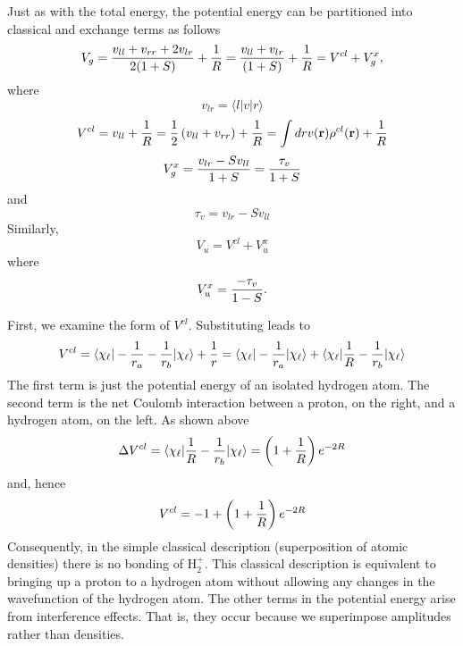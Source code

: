 Just as with the total energy, the potential energy can be partitioned 
into classical and exchange terms as follows
\begin{equation}
V_g = {v_{ll} + v_{rr} + 2v_{lr} \over 2(1+S)} + {1 \over R} = 
{v_{ll} + v_{lr} \over (1+S)} + {1 \over R} = V^{cl} + V^x_g ,
\end{equation}
where
\begin{equation}
v_{lr} = \langle l \vert v \vert r \rangle 
\end{equation}
\begin{equation}
V^{cl} = v_{ll} + {1 \over R} = {1 \over 2} \left( v_{ll} + v_{rr} 
\right) + {1 \over R} = \int d r v ( {\bf r} ) \rho^{cl} ( {\bf 
r} ) + {1 \over R}
\end{equation}
\begin{equation}
V^x_g = {v_{lr} - Sv_{ll} \over 1+S} = {\tau_v \over 1+S}
\end{equation}
and
\begin{equation}
\tau_v = v_{lr} - Sv_{ll}
\end{equation}
Similarly,
\begin{equation}
V_u = V^{cl} + V^x_u
\end{equation}
where
\begin{equation}
V^x_u = {- \tau_v \over 1-S} .
\end{equation}

First, we examine the form of $V^{cl}$. Substituting leads to
\begin{equation}
V^{cl} = \langle \chi_\ell \vert - {1 \over r_a} - {1 \over r_b} \vert 
\chi_\ell \rangle + {1 \over r} = \langle \chi_\ell \vert - {1 \over r_a} 
\vert \chi_\ell \rangle + \langle \chi_\ell \vert {1 \over R} - {1 \over 
r_b} \vert \chi_\ell \rangle
\end{equation}
The first term is just the potential energy of an isolated hydrogen 
atom. The second term is the net Coulomb interaction between a proton, 
on the right, and a hydrogen atom, on the left. As shown above
\begin{equation}
\Delta V^{cl} = \langle \chi_\ell \vert {1 \over R} - {1 \over r_b} 
\vert \chi_\ell \rangle = \left( 1 + {1 \over R} \right) e^{-2R}
\end{equation}
and, hence
\begin{equation}
V^{cl} = - 1 + \left( 1 + {1 \over R} \right) e^{-2R}
\end{equation}
Consequently, in the simple classical description (superposition of atomic
densities) there is no bonding of H$^+_2$.  This classical description is 
equivalent to bringing up a proton to a hydrogen atom without allowing 
any changes in the wavefunction of the hydrogen atom.  The other terms in 
the potential energy arise from interference effects.  That is, they occur 
because we superimpose amplitudes rather than densities.
    
